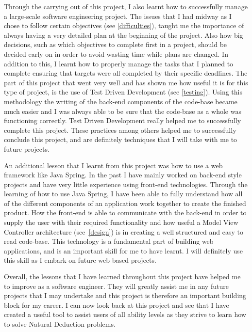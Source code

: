 Through the carrying out of this project, I also learnt how to successfully manage a large-scale software engineering project. The issues that I had midway as I chose to follow certain objectives (see \ref{difficulties}), taught me the importance of always having a very detailed plan at the beginning of the project. Also how big decisions, such as which objectives to complete first in a project, should be decided early on in order to avoid wasting time while plans are changed. In addition to this, I learnt how to properly manage the tasks that I planned to complete ensuring that targets were all completed by their specific deadlines. The part of this project that went very well and has shown me how useful it is for this type of project, is the use of Test Driven Development (see \ref{testing}). Using this methodology the writing of the back-end components of the code-base became much easier and I was always able to be sure that the code-base as a whole was functioning correctly. Test Driven Development really helped me to successfully complete this project. These practices among others helped me to successfully conclude this project, and are definitely techniques that I will take with me to future projects.

An additional lesson that I learnt from this project was how to use a web framework like Java Spring. In the past I have mainly worked on back-end style projects and have very little experience using front-end technologies. Through the learning of how to use Java Spring, I have been able to fully understand how all of the different components of an application work together to create the finished product. How the front-end is able to communicate with the back-end in order to supply the user with their required functionality and how useful a Model View Controller architecture (see~\ref{design}) is in creating a well structured and easy to read code-base. This technology is a fundamental part of building web applications, and is an important skill for me to have learnt. I will definitely use this skill as I embark on future web based projects.

Overall, the lessons that I have learned throughout this project have helped me to improve as a software engineer. They will greatly assist me in any future projects that I may undertake and this project is therefore an important building block for my career. I can now look back at this project and see that I have created a useful tool to assist users of all ability levels as they strive to learn how to solve Natural Deduction problems.

